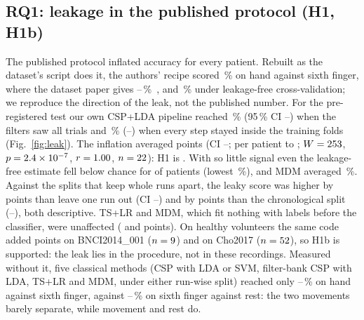 \subsection{RQ1: leakage in the published protocol (H1, H1b)}
\label{sec:leak}
The published protocol inflated accuracy for every patient. Rebuilt as the dataset's script does
it, the authors' recipe scored \rqOneCspLdaReplicaPaperReplicaMean\,\% on hand against sixth
finger, where the dataset paper gives
\rqOnePublishedGroupBCspLda--\rqOnePublishedGroupTCspLda\,\%~\cite{wang2026dataset}, and
\rqOneCspLdaReplicaCvLeakfreeMean\,\% under leakage-free cross-validation; we reproduce the
direction of the leak, not the published number. For the pre-registered test our own CSP+LDA
pipeline reached \rqOneCspLdaPaperReplicaMean\,\% (95\,\% CI
\rqOneCspLdaPaperReplicaCiLo--\rqOneCspLdaPaperReplicaCiHi) when the filters saw all trials and
\rqOneCspLdaCvLeakfreeMean\,\% (\rqOneCspLdaCvLeakfreeCiLo--\rqOneCspLdaCvLeakfreeCiHi) when every
step stayed inside the training folds (Fig.~\ref{fig:leak}). The inflation averaged
\rqOneHOneDiff{} points (CI \rqOneHOneDiffCiLo--\rqOneHOneDiffCiHi; per patient
\rqOneHOneDiffMin{} to \rqOneHOneDiffMax; $W = 253$, $p = 2.4\times10^{-7}$,
$r = 1.00$, $n = 22$): H1 is \rqOneHOneCategory. With so little signal even the
leakage-free estimate fell below chance for \rqOneCspLdaCvLeakfreeNBelowChance{} of
\rqOneHOneN{} patients (lowest \rqOneCspLdaCvLeakfreeMin\,\%), and MDM averaged
\rqOneMdmCvLeakfreeMean\,\%. Against the splits that keep whole runs apart, the leaky score was
higher by \rqOneCspLdaPaperReplicaMinusLoroDiff{} points than leave one run out (CI
\rqOneCspLdaPaperReplicaMinusLoroDiffCiLo--\rqOneCspLdaPaperReplicaMinusLoroDiffCiHi) and by
\rqOneCspLdaPaperReplicaMinusChronoDiff{} points than the chronological split
(\rqOneCspLdaPaperReplicaMinusChronoDiffCiLo--\rqOneCspLdaPaperReplicaMinusChronoDiffCiHi), both
descriptive. TS+LR and MDM, which fit nothing with labels before the classifier, were unaffected
(\rqOneTsLrLeakDiff{} and \rqOneMdmLeakDiff{} points). On healthy volunteers the same code added
\rqOneBnciHOneBDiff{} points on BNCI2014\_001 ($n = 9$) and \rqOneChoHOneBDiff{} on
Cho2017 ($n = 52$), so H1b is supported: the leak lies in the procedure, not in
these recordings. Measured without it, five classical methods (CSP with LDA or SVM, filter-bank CSP with LDA,
TS+LR and MDM, under either run-wise split) reached only
\rqOneHeldOutRunsMeanMin--\rqOneHeldOutRunsMeanMax\,\% on hand against sixth finger, against
\rqOneSfRestHeldOutRunsMeanMin--\rqOneSfRestHeldOutRunsMeanMax\,\% on sixth finger against
rest: the two movements barely separate, while movement and rest do.

